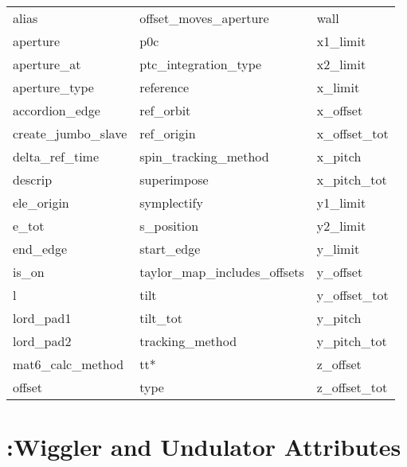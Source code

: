  \begin{tabular}{lll} \toprule
alias                       & offset_moves_aperture       & wall                        \\
aperture                    & p0c                         & x1_limit                    \\
aperture_at                 & ptc_integration_type        & x2_limit                    \\
aperture_type               & reference                   & x_limit                     \\
accordion_edge              & ref_orbit                   & x_offset                    \\
create_jumbo_slave          & ref_origin                  & x_offset_tot                \\
delta_ref_time              & spin_tracking_method        & x_pitch                     \\
descrip                     & superimpose                 & x_pitch_tot                 \\
ele_origin                  & symplectify                 & y1_limit                    \\
e_tot                       & s_position                  & y2_limit                    \\
end_edge                    & start_edge                  & y_limit                     \\
is_on                       & taylor_map_includes_offsets & y_offset                    \\
l                           & tilt                        & y_offset_tot                \\
lord_pad1                   & tilt_tot                    & y_pitch                     \\
lord_pad2                   & tracking_method             & y_pitch_tot                 \\
mat6_calc_method            & tt*                         & z_offset                    \\
offset                      & type                        & z_offset_tot                \\
 \bottomrule
 \end{tabular}
 \vfill
 
 \section{:Wiggler and Undulator Attributes}
 \label{s:list.wiggler}
 
